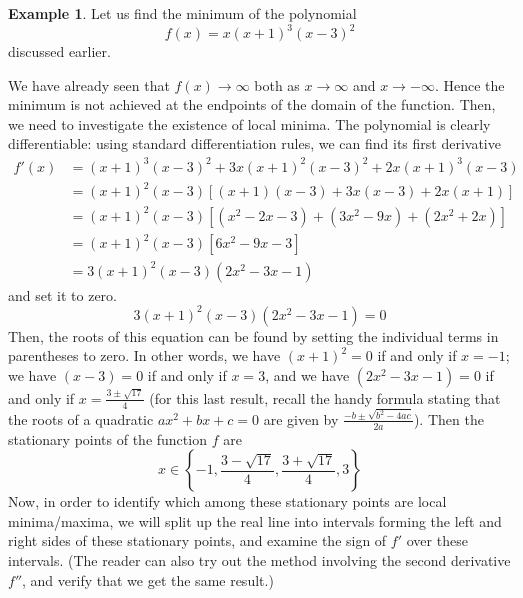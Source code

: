 \documentclass[a4paper]{article}
\theoremstyle{definition}
\newtheorem{example}{Example}[section]
\begin{document}
\begin{example}
	Let us find the minimum of the polynomial
	\begin{equation*}
		f(x) = x (x + 1)^3 (x - 3)^2
	\end{equation*}
	discussed earlier.

	We have already seen that $f(x) \rightarrow \infty$ both as $x \rightarrow \infty$ and $x \rightarrow -\infty$.
	Hence the minimum is not achieved at the endpoints of the domain of the function.
	Then, we need to investigate the existence of local minima.
	The polynomial is clearly differentiable: using standard differentiation rules, we can find its first derivative
	\begin{align*}
		f'(x) & = (x + 1)^3 (x - 3)^2 + 3x (x + 1)^2 (x - 3)^2 + 2x (x + 1)^3 (x - 3) \\
		& = (x + 1)^2 (x - 3) [ (x + 1) (x - 3) + 3x (x - 3) + 2x (x + 1) ] \\
		& = (x + 1)^2 (x - 3) [ (x^2 - 2x - 3) + (3x^2 - 9x) + (2x^2 + 2x) ] \\
		& = (x + 1)^2 (x - 3) [6x^2 - 9x - 3] \\
		& = 3 (x + 1)^2 (x - 3) (2x^2 - 3x - 1)
	\end{align*}
	and set it to zero.
	\begin{equation*}
		3 (x + 1)^2 (x - 3) (2x^2 - 3x - 1) = 0
	\end{equation*}
	Then, the roots of this equation can be found by setting the individual terms in parentheses to zero.
	In other words, we have $(x + 1)^2 = 0$ if and only if $x = -1$; we have $(x - 3) = 0$ if and only if $x = 3$, and we have $(2x^2 - 3x - 1) = 0$ if and only if $x = \frac{3 \pm \sqrt{17}}{4}$ (for this last result, recall the handy formula stating that the roots of a quadratic $ax^2 + bx + c = 0$ are given by $\frac{- b \pm \sqrt{b^2 - 4ac}}{2a}$).
	Then the stationary points of the function $f$ are
	\begin{equation*}
		x \in \left\{ -1, \frac{3 - \sqrt{17}}{4}, \frac{3 + \sqrt{17}}{4}, 3 \right\}
	\end{equation*}
	Now, in order to identify which among these stationary points are local minima/maxima, we will split up the real line into intervals forming the left and right sides of these stationary points, and examine the sign of $f'$ over these intervals.
	(The reader can also try out the method involving the second derivative $f''$, and verify that we get the same result.)


\end{example}
\end{document}
